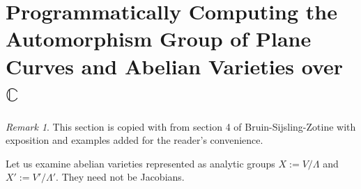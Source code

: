 \documentclass[12pt,reqno]{amsart}
\DeclareMathOperator{\Jac}{Jac}
\newcommand{\C}{\mathbb{C}}
\newcommand{\Z}{\mathbb{Z}}
\theoremstyle{definition}
\theoremstyle{remark}
\newtheorem*{remark}{Remark}
\begin{document}



 










\section{Programmatically Computing the Automorphism Group of Plane Curves and Abelian Varieties over $\mathbb{C}$}
\label{sec:chap4}
\begin{remark} This section is copied with from section 4 of Bruin-Sijsling-Zotine \cite{jeroen} with exposition and examples added for the reader's convenience.\end{remark}

Let us examine abelian varieties represented as analytic groups $X := V/\Lambda$ and $X' := V'/\Lambda'$. They need not be Jacobians.

 
\end{document}
